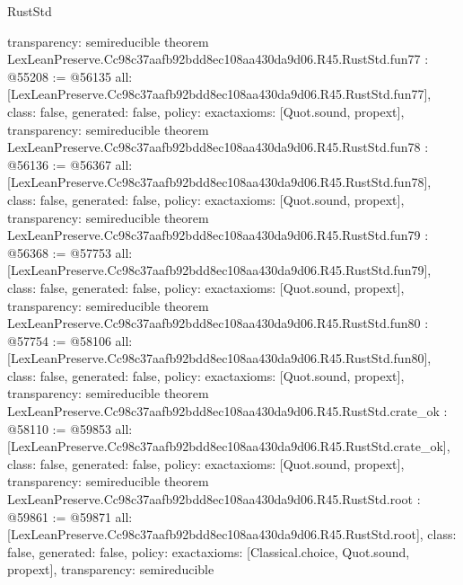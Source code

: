\begin{lexlean}{RustStd}
\begin{coremodule}
{  transparency: semireducible
}
theorem LexLeanPreserve.Cc98c37aafb92bdd8ec108aa430da9d06.R45.RustStd.fun77 : @55208 := @56135 {
  all: [LexLeanPreserve.Cc98c37aafb92bdd8ec108aa430da9d06.R45.RustStd.fun77],
  class: false,
  generated: false,
  policy: exact{axioms: [Quot.sound, propext]},
  transparency: semireducible
}
theorem LexLeanPreserve.Cc98c37aafb92bdd8ec108aa430da9d06.R45.RustStd.fun78 : @56136 := @56367 {
  all: [LexLeanPreserve.Cc98c37aafb92bdd8ec108aa430da9d06.R45.RustStd.fun78],
  class: false,
  generated: false,
  policy: exact{axioms: [Quot.sound, propext]},
  transparency: semireducible
}
theorem LexLeanPreserve.Cc98c37aafb92bdd8ec108aa430da9d06.R45.RustStd.fun79 : @56368 := @57753 {
  all: [LexLeanPreserve.Cc98c37aafb92bdd8ec108aa430da9d06.R45.RustStd.fun79],
  class: false,
  generated: false,
  policy: exact{axioms: [Quot.sound, propext]},
  transparency: semireducible
}
theorem LexLeanPreserve.Cc98c37aafb92bdd8ec108aa430da9d06.R45.RustStd.fun80 : @57754 := @58106 {
  all: [LexLeanPreserve.Cc98c37aafb92bdd8ec108aa430da9d06.R45.RustStd.fun80],
  class: false,
  generated: false,
  policy: exact{axioms: [Quot.sound, propext]},
  transparency: semireducible
}
theorem LexLeanPreserve.Cc98c37aafb92bdd8ec108aa430da9d06.R45.RustStd.crate_ok : @58110 := @59853 {
  all: [LexLeanPreserve.Cc98c37aafb92bdd8ec108aa430da9d06.R45.RustStd.crate_ok],
  class: false,
  generated: false,
  policy: exact{axioms: [Quot.sound, propext]},
  transparency: semireducible
}
theorem LexLeanPreserve.Cc98c37aafb92bdd8ec108aa430da9d06.R45.RustStd.root : @59861 := @59871 {
  all: [LexLeanPreserve.Cc98c37aafb92bdd8ec108aa430da9d06.R45.RustStd.root],
  class: false,
  generated: false,
  policy: exact{axioms: [Classical.choice, Quot.sound, propext]},
  transparency: semireducible
}


\end{coremodule}
\end{lexlean}
